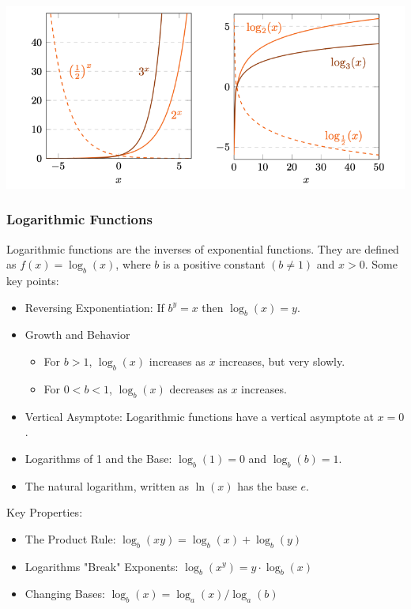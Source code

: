 \documentclass[12pt]{article}
\theoremstyle{definition}
\begin{document}
\includegraphics[width=\textwidth]{4_func2}


\subsubsection*{Logarithmic Functions}

Logarithmic functions are the inverses of exponential functions. They are defined as $f(x) = \log_b(x)$, where $b$ is a positive constant $(b \neq 1)$ and $x > 0$. Some key points:

\begin{itemize}
    \item Reversing Exponentiation: If $b^y = x$ then $\log_b(x) = y$.
    
    \item Growth and Behavior
    \begin{itemize}
        \item For $b > 1$, $\log_b(x)$ increases as $x$ increases, but very slowly.
        
        \item For $0 < b < 1$, $\log_b(x)$ decreases as $x$ increases.
    \end{itemize}
    
    \item Vertical Asymptote: Logarithmic functions have a vertical asymptote at $x = 0$.
    
    \item Logarithms of 1 and the Base: $\log_b(1) = 0$ and $\log_b(b) = 1$.
    
    \item The natural logarithm, written as $\ln(x)$ has the base $e$.
\end{itemize}

Key Properties:

\begin{itemize}
    \item The Product Rule: $\log_b(xy) = \log_b(x) + \log_b(y)$
    
    \item Logarithms "Break" Exponents: $\log_b(x^y) = y \cdot \log_b(x)$
    
    \item Changing Bases: $\log_b(x) = \log_a(x) / \log_a(b)$
\end{itemize}
\end{document}
